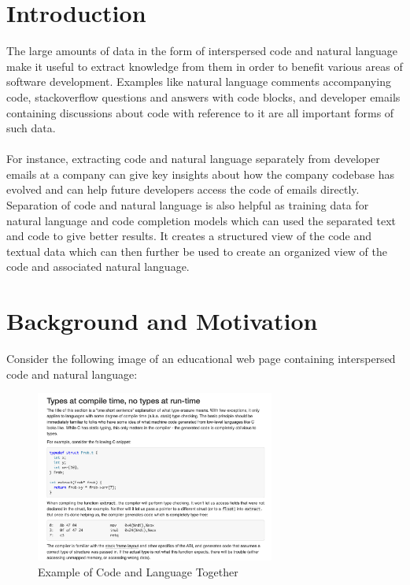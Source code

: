 \documentclass{scrreprt}
\begin{document}
\chapter{Introduction}


The large amounts of data in the form of interspersed code and natural language make it useful to extract knowledge from them in order to benefit various areas of software development. Examples like natural language comments accompanying code, stackoverflow questions and answers with code blocks, and developer emails containing discussions about code with reference to it are all important forms of such data. \\ 
\\ For instance, extracting code and natural language separately from developer emails at a company can give key insights about how the company codebase has evolved and can help future developers access the code of emails directly. Separation of code and natural language is also helpful as training data for natural language and code completion models which can used the separated text and code to give better results. It creates a structured view of the code and textual data which can then further be used to create an organized view of the code and associated natural language. 


\chapter{Background and Motivation}


Consider the following image of an educational web page containing interspersed code and natural language:

\begin{figure}[h]
    \centering
    \includegraphics[width=0.7\textwidth]{figures/background-eg.png}
    \caption{Example of Code and Language Together}
    \label{fig:high-level-arch}
\end{figure}
\end{document}

